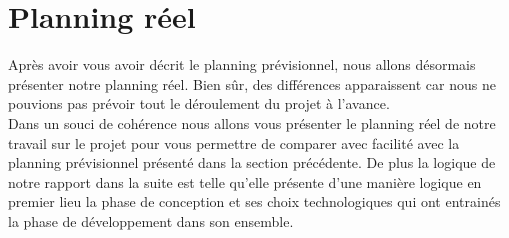 \documentclass[12pt]{report}
\begin{document}
	\section{Planning réel}

Après avoir vous avoir décrit le planning prévisionnel, nous allons désormais présenter notre planning réel. Bien sûr, des différences apparaissent car nous ne pouvions pas prévoir tout le déroulement du projet à l'avance.\\

Dans un souci de cohérence nous allons vous présenter le planning réel de notre travail sur le projet pour vous permettre de comparer avec facilité avec la planning prévisionnel présenté dans la section précédente. De plus la logique de notre rapport dans la suite est telle qu’elle présente d’une manière logique en premier lieu la phase de conception et ses choix technologiques qui ont entrainés la phase de développement dans son ensemble.\\
\end{document}
